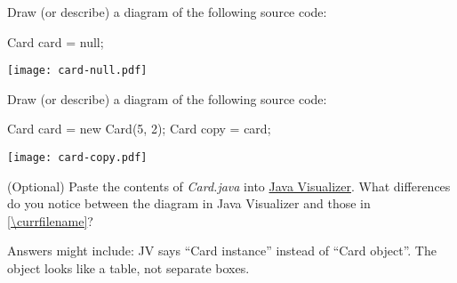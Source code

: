 \Q Draw (or describe) a diagram of the following source code:

\begin{javalst}
Card card = null;
\end{javalst}


\begin{answer}[10em]
\texttt{[image: card-null.pdf]}
\end{answer}


\Q Draw (or describe) a diagram of the following source code:

\begin{javalst}
Card card = new Card(5, 2);
Card copy = card;
\end{javalst}

\begin{answer}[20em]
\texttt{[image: card-copy.pdf]}
\end{answer}


\Q (Optional) Paste the contents of \textit{Card.java} into \href{https://cscircles.cemc.uwaterloo.ca/java_visualize/#code=public+class+ClassNameHere+%7B%0A++++public+static+void+main(String%5B%5D+args)+%7B%0A++++++++%0A++++%7D%0A%7D&mode=edit&showStringsAsObjects=1}{Java Visualizer}.
What differences do you notice between the diagram in Java Visualizer and those in \ref{\currfilename}?

\begin{answer}
Answers might include:
\bull JV says ``Card instance'' instead of ``Card object''.
\bull The object looks like a table, not separate boxes.
\end{answer}
